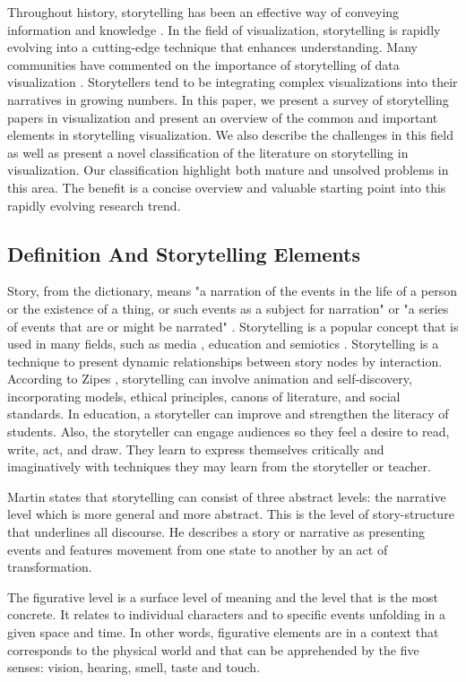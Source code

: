 \documentclass{egpubl}
\begin{document}
Throughout history, storytelling has been an effective way of conveying information and knowledge \cite{Lidal2013}. In the field of visualization, storytelling is rapidly evolving into a cutting-edge technique that enhances understanding. Many communities have commented on the importance of storytelling of data visualization \cite{segal}. Storytellers tend to be integrating complex visualizations into their narratives in growing numbers. In this paper, we present a survey of storytelling papers in visualization and present an overview of the common and important elements in storytelling visualization. We also describe the challenges in this field as well as present a novel classification of the literature on storytelling in visualization. Our classification highlight both mature and unsolved problems in this area. The benefit is a concise overview and valuable starting point into this rapidly evolving research trend. 

\subsection{Definition And Storytelling Elements}
Story, from the dictionary, means "a narration of the events in the life of a person or the existence of a thing, or such events as a subject for narration" \cite{story1} or "a series of events that are or might be narrated" \cite{story2}. Storytelling is a popular concept that is used in many fields, such as media \cite{segal}, education \cite{Jack1995} and semiotics \cite{Martin1997}.
Storytelling is a technique to present dynamic relationships between story nodes by interaction.
According to Zipes \cite{Jack1995}, storytelling can involve animation and self-discovery, incorporating models, ethical principles, canons of literature, and social standards. In education, a storyteller can improve and strengthen the literacy of students. Also, the storyteller can engage audiences so they feel a desire to read, write, act, and draw. They learn to express themselves critically and imaginatively with techniques they may learn from the storyteller or teacher.

Martin\cite{Martin1997} states that storytelling can consist of three abstract levels: the narrative level which is more general and more abstract. This is the level of story-structure that underlines all discourse. He describes a story or narrative as presenting events and features movement from one state to another by an act of transformation.

The figurative level is a surface level of meaning and the level that is the most concrete. It relates to individual characters and to specific events unfolding in a given space and time. In other words, figurative elements are in a context that corresponds to the physical world and that can be apprehended by the five senses: vision, hearing, smell, taste and touch.
\end{document}
